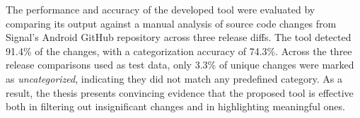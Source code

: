 The performance and accuracy of the developed tool were evaluated by comparing its output against a manual analysis of source code changes from  Signal's Android GitHub repository across three release diffs. The tool detected 91.4\% of the changes, with a categorization accuracy of 74.3\%. Across the three release comparisons used as test data, only 3.3\% of unique changes were marked as \textit{uncategorized}, indicating they did not match any predefined category. As a result, the thesis presents convincing evidence that the proposed tool is effective both in filtering out insignificant changes and in highlighting meaningful ones.


